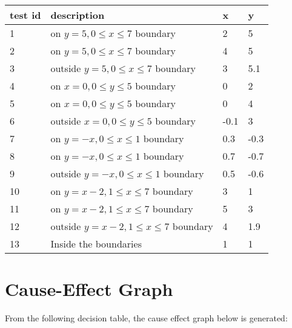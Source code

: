 \documentclass[letterpaper]{article}
\begin{document}
\begin{adjustbox}{center}
	\begin{tabular}{llll}
		test id & description                              & x    & y    \\ \hline
		1       & on $y=5, 0\leq x\leq 7$ boundary         & 2    & 5    \\
		2       & on $y=5, 0\leq x\leq 7$ boundary         & 4    & 5    \\
		3       & outside $y=5, 0\leq x\leq 7$ boundary    & 3    & 5.1  \\
		4       & on $x=0, 0\leq y \leq 5$ boundary        & 0    & 2    \\
		5       & on $x=0, 0\leq y \leq 5$ boundary        & 0    & 4    \\
		6       & outside $x=0, 0\leq y \leq 5$ boundary   & -0.1 & 3    \\
		7       & on $y=-x, 0\leq x\leq 1$ boundary        & 0.3  & -0.3 \\
		8       & on $y=-x, 0\leq x\leq 1$ boundary        & 0.7  & -0.7 \\
		9       & outside  $y=-x, 0\leq x\leq 1$ boundary  & 0.5  & -0.6 \\
		10      & on $y=x-2, 1\leq x \leq 7$ boundary      & 3    & 1    \\
		11      & on $y=x-2, 1\leq x \leq 7$ boundary      & 5    & 3    \\
		12      & outside $y=x-2, 1\leq x \leq 7$ boundary & 4    & 1.9  \\
		13      & Inside the boundaries                    & 1    & 1    \\
	\end{tabular}
\end{adjustbox}

\section{Cause-Effect Graph}
From the following decision table, the cause effect graph below is generated:
\end{document}
